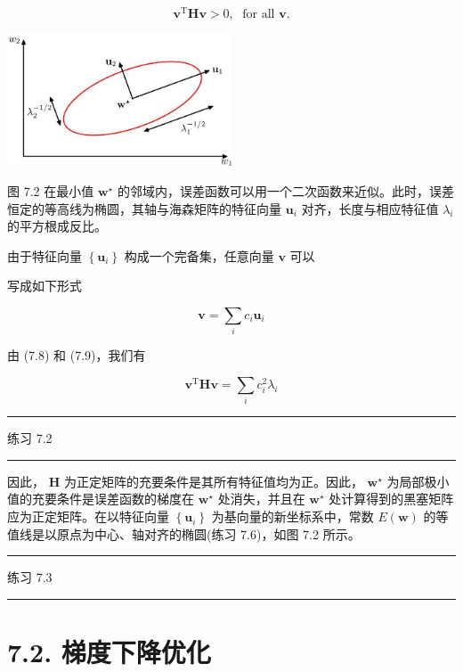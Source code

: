 \documentclass[10pt]{report}
\newcommand{\HRule}{\begin{center}\rule{0.9\linewidth}{0.2mm}\end{center}}
\begin{document}
\[
{\mathbf{v}}^{\mathrm{T}}\mathbf{H}\mathbf{v} > 0,\;\text{ for all }\mathbf{v}. \tag{7.12}
\]

\begin{center}
\includegraphics[max width=0.5\textwidth]{images/0194e279-9b28-703a-88f4-c3ac21e2010d_232_872_344_663_393_0.jpg}
\end{center}
\hspace*{3em} 

图 7.2 在最小值 \({\mathbf{w}}^{ \star  }\) 的邻域内，误差函数可以用一个二次函数来近似。此时，误差恒定的等高线为椭圆，其轴与海森矩阵的特征向量 \({\mathbf{u}}_{i}\) 对齐，长度与相应特征值 \({\lambda }_{i}\) 的平方根成反比。

由于特征向量 \(\left\{  {\mathbf{u}}_{i}\right\}\) 构成一个完备集，任意向量 \(\mathbf{v}\) 可以

写成如下形式

\[
\mathbf{v} = \mathop{\sum }\limits_{i}{c}_{i}{\mathbf{u}}_{i} \tag{7.13}
\]

由 (7.8) 和 (7.9)，我们有

\[
{\mathbf{v}}^{\mathrm{T}}\mathbf{H}\mathbf{v} = \mathop{\sum }\limits_{i}{c}_{i}^{2}{\lambda }_{i} \tag{7.14}
\]

\HRule

练习 7.2

\HRule

因此， \(\mathbf{H}\) 为正定矩阵的充要条件是其所有特征值均为正。因此， \({\mathbf{w}}^{ \star  }\) 为局部极小值的充要条件是误差函数的梯度在 \({\mathbf{w}}^{ \star  }\) 处消失，并且在 \({\mathbf{w}}^{ \star  }\) 处计算得到的黑塞矩阵应为正定矩阵。在以特征向量 \(\left\{  {\mathbf{u}}_{i}\right\}\) 为基向量的新坐标系中，常数 \(E\left( \mathbf{w}\right)\) 的等值线是以原点为中心、轴对齐的椭圆(练习 7.6)，如图 7.2 所示。

\HRule

练习 7.3

\HRule

\section*{7.2. 梯度下降优化}
\end{document}
